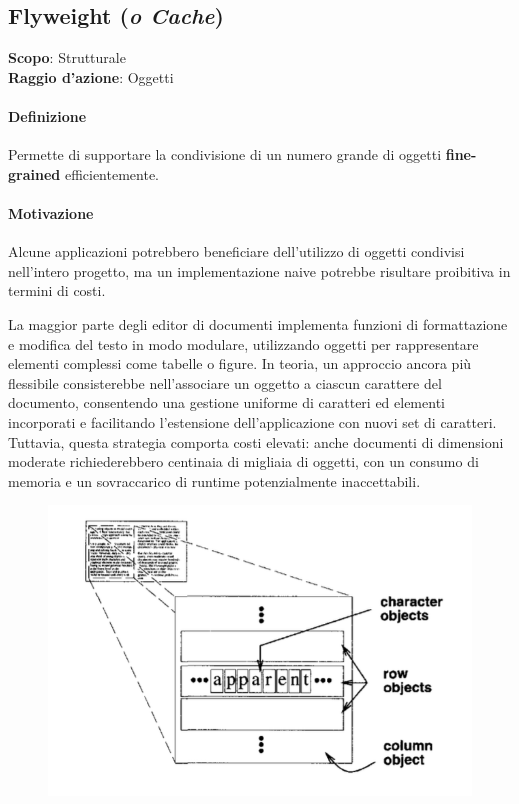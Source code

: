 \subsection{Flyweight (\textit{o Cache})}
\label{flyweight}

\textbf{Scopo}: Strutturale \\
\textbf{Raggio d'azione}: Oggetti

\paragraph{Definizione} Permette di supportare la condivisione di un numero grande di oggetti \textbf{fine-grained} efficientemente.

\paragraph{Motivazione} Alcune applicazioni potrebbero beneficiare dell'utilizzo di oggetti condivisi nell'intero progetto, ma un implementazione naive potrebbe risultare proibitiva in termini di costi.

La maggior parte degli editor di documenti implementa funzioni di formattazione e modifica del testo in modo modulare, utilizzando oggetti per rappresentare elementi complessi come tabelle o figure. In teoria, un approccio ancora più flessibile consisterebbe nell'associare un oggetto a ciascun carattere del documento, consentendo una gestione uniforme di caratteri ed elementi incorporati e facilitando l'estensione dell'applicazione con nuovi set di caratteri. Tuttavia, questa strategia comporta costi elevati: anche documenti di dimensioni moderate richiederebbero centinaia di migliaia di oggetti, con un consumo di memoria e un sovraccarico di runtime potenzialmente inaccettabili.

\begin{figure}[H]
    \centering
    \includegraphics[width=0.5\linewidth]{assets/pattern/flyweight/flyweight-esempio.png}
\end{figure}

